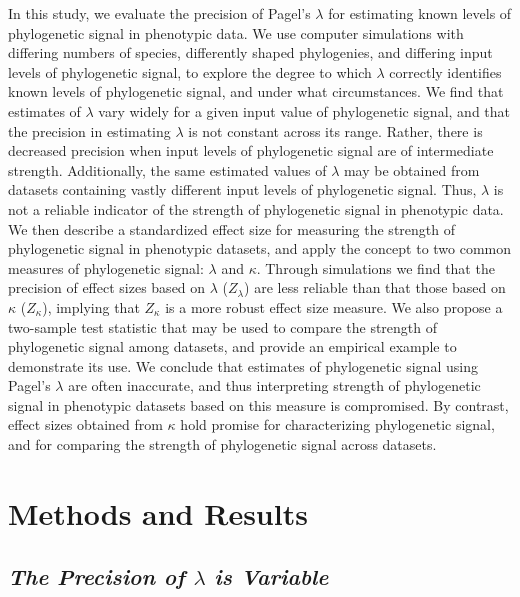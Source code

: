 \documentclass[
]{article}
\begin{document}
In this study, we evaluate the precision of Pagel's \(\lambda\) for
estimating known levels of phylogenetic signal in phenotypic data. We
use computer simulations with differing numbers of species, differently
shaped phylogenies, and differing input levels of phylogenetic signal,
to explore the degree to which \(\lambda\) correctly identifies known
levels of phylogenetic signal, and under what circumstances. We find
that estimates of \(\lambda\) vary widely for a given input value of
phylogenetic signal, and that the precision in estimating \(\lambda\) is
not constant across its range. Rather, there is decreased precision when
input levels of phylogenetic signal are of intermediate strength.
Additionally, the same estimated values of \(\lambda\) may be obtained
from datasets containing vastly different input levels of phylogenetic
signal. Thus, \(\lambda\) is not a reliable indicator of the strength of
phylogenetic signal in phenotypic data. We then describe a standardized
effect size for measuring the strength of phylogenetic signal in
phenotypic datasets, and apply the concept to two common measures of
phylogenetic signal: \(\lambda\) and \(\kappa\). Through simulations we
find that the precision of effect sizes based on \(\lambda\)
(\(Z_{\lambda}\)) are less reliable than that those based on \(\kappa\)
(\(Z_\kappa\)), implying that \(Z_\kappa\) is a more robust effect size
measure. We also propose a two-sample test statistic that may be used to
compare the strength of phylogenetic signal among datasets, and provide
an empirical example to demonstrate its use. We conclude that estimates
of phylogenetic signal using Pagel's \(\lambda\) are often inaccurate,
and thus interpreting strength of phylogenetic signal in phenotypic
datasets based on this measure is compromised. By contrast, effect sizes
obtained from \(\kappa\) hold promise for characterizing phylogenetic
signal, and for comparing the strength of phylogenetic signal across
datasets.

\hypertarget{methods-and-results}{%
\section{Methods and Results}\label{methods-and-results}}

\hypertarget{the-precision-of-lambda-is-variable}{%
\subsection{\texorpdfstring{\emph{The Precision of \(\lambda\) is
Variable}}{The Precision of \textbackslash lambda is Variable}}\label{the-precision-of-lambda-is-variable}}
\end{document}
